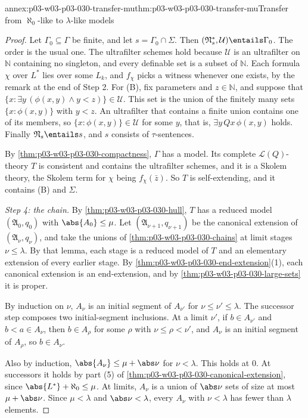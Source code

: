 \begin{annexitem}{annex:p03-w03-p03-030-transfer-mu}{thm:p03-w03-p03-030-transfer-mu}{Transfer from \(\aleph_0\)-like to \(\lambda\)-like models}
\begin{proof}
Let \(\Gamma_0\subseteq\Gamma\) be finite, and let \(s=\Gamma_0\cap\Sigma\).
Then \((\mathfrak N^*_s,\mathcal U)\entails\Gamma_0\).  The order is the
usual one.  The ultrafilter schemes hold because \(\mathcal U\) is an
ultrafilter on \(\mathbb N\) containing no singleton, and every definable
set is a subset of \(\mathbb N\).  Each formula \(\chi\) over \(L^*\) lies
over some \(L_k\), and \(f_\chi\) picks a witness whenever one exists, by
the remark at the end of Step 2.  For (B), fix parameters and
\(z\in\mathbb N\), and suppose that \(\{x:\exists y\,(\phi(x,y)\wedge
y<z)\}\in\mathcal U\).  This set is the union of the finitely many sets
\(\{x:\phi(x,y)\}\) with \(y<z\).  An ultrafilter that contains a finite
union contains one of its members, so \(\{x:\phi(x,y)\}\in\mathcal U\) for
some \(y\), that is, \(\exists y\,Qx\,\phi(x,y)\) holds.  Finally
\(\mathfrak N_s\entails s\), and \(s\) consists of \(\tau\)-sentences.

By \cref{thm:p03-w03-p03-030-compactness}, \(\Gamma\) has a model.  Its
complete \(\mathscr L(Q)\)-theory \(T\) is consistent and contains the
ultrafilter schemes, and it is a Skolem theory, the Skolem term for
\(\chi\) being \(f_\chi(\bar z)\).  So \(T\) is self-extending, and it
contains (B) and \(\Sigma\).

\emph{Step 4: the chain.}  By \cref{thm:p03-w03-p03-030-hull}, \(T\) has a
reduced model \((\mathfrak A_0,q_0)\) with \(\abs{A_0}\le\mu\).  Let
\((\mathfrak A_{\nu+1},q_{\nu+1})\) be the canonical extension of
\((\mathfrak A_\nu,q_\nu)\), and take the unions of
\cref{thm:p03-w03-p03-030-chains} at limit stages \(\nu\le\lambda\).  By that
lemma, each stage is a reduced model of \(T\) and an elementary extension of
every earlier stage.  By \cref{thm:p03-w03-p03-030-end-extension}(1), each
canonical extension is an end-extension, and by
\cref{thm:p03-w03-p03-030-large-sets} it is proper.

By induction on \(\nu\), \(A_\nu\) is an initial segment of \(A_{\nu'}\) for
\(\nu\le\nu'\le\lambda\).  The successor step composes two initial-segment
inclusions.  At a limit \(\nu'\), if \(b\in A_{\nu'}\) and \(b<a\in A_\nu\),
then \(b\in A_\rho\) for some \(\rho\) with \(\nu\le\rho<\nu'\), and \(A_\nu\)
is an initial segment of \(A_\rho\), so \(b\in A_\nu\).

Also by induction, \(\abs{A_\nu}\le\mu+\abs\nu\) for \(\nu<\lambda\).  This
holds at \(0\).  At successors it holds by part (5) of
\cref{thm:p03-w03-p03-030-canonical-extension}, since
\(\abs{L^*}+\aleph_0\le\mu\).  At limits, \(A_\nu\) is a union of \(\abs\nu\)
sets of size at most \(\mu+\abs\nu\).  Since \(\mu<\lambda\) and
\(\abs\nu<\lambda\), every \(A_\nu\) with \(\nu<\lambda\) has fewer than
\(\lambda\) elements.


\end{proof}
\end{annexitem}
